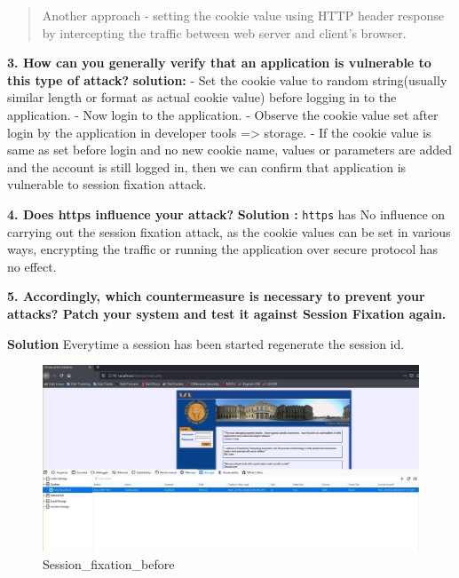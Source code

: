 \begin{quote}
Another approach - setting the cookie value using HTTP header response
by intercepting the traffic between web server and client's browser.
\end{quote}

\textbf{3. How can you generally verify that an application is
vulnerable to this type of attack?} \textbf{solution:} - Set the cookie
value to random string(usually similar length or format as actual cookie
value) before logging in to the application. - Now login to the
application. - Observe the cookie value set after login by the
application in developer tools =\textgreater{} storage. - If the cookie
value is same as set before login and no new cookie name, values or
parameters are added and the account is still logged in, then we can
confirm that application is vulnerable to session fixation attack.

\textbf{4. Does https influence your attack?} \textbf{Solution :}
\texttt{https} has No influence on carrying out the session fixation
attack, as the cookie values can be set in various ways, encrypting the
traffic or running the application over secure protocol has no effect.

\textbf{5. Accordingly, which countermeasure is necessary to prevent
your attacks? Patch your system and test it against Session Fixation
again.}

\textbf{Solution} Everytime a session has been started regenerate the
session id.

\begin{Shaded}
\begin{Highlighting}[]
    \NormalTok{()}\OtherTok{;}
    \NormalTok{(}\NormalTok{)}\OtherTok{;} 
    \OperatorTok{=}\NormalTok{()}\OtherTok{;} 
\end{Highlighting}
\end{Shaded}

\begin{figure}
\centering
\includegraphics{images/task2/Session_fixation_before.JPG}
\caption{Session\_fixation\_before}
\end{figure}

